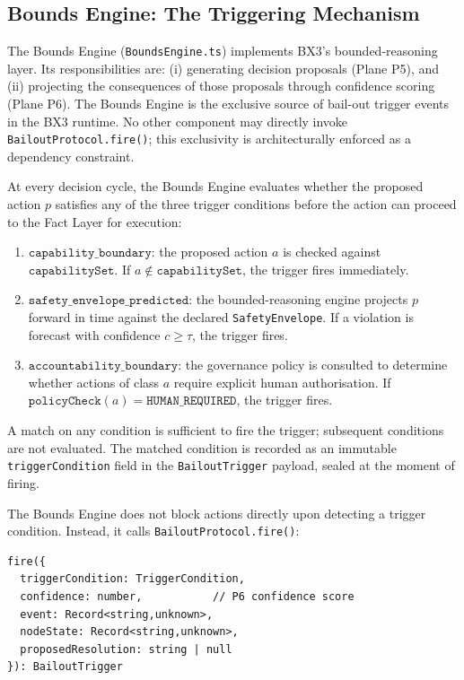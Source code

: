 \documentclass[12pt]{article}
\begin{document}
\subsection{Bounds Engine: The Triggering Mechanism}
\label{sec:bounds-engine-trigger}

The Bounds Engine (\texttt{BoundsEngine.ts}) implements BX3's bounded-reasoning layer. Its responsibilities are: (i) generating decision proposals (Plane P5), and (ii) projecting the consequences of those proposals through confidence scoring (Plane P6). The Bounds Engine is the exclusive source of bail-out trigger events in the BX3 runtime. No other component may directly invoke \texttt{BailoutProtocol.fire()}; this exclusivity is architecturally enforced as a dependency constraint.

At every decision cycle, the Bounds Engine evaluates whether the proposed action $p$ satisfies any of the three trigger conditions before the action can proceed to the Fact Layer for execution:

\begin{enumerate}
  \item[\textbf{C1}] $\texttt{capability\_boundary}$: the proposed action $a$ is checked against $\texttt{capabilitySet}$. If $a \notin \texttt{capabilitySet}$, the trigger fires immediately.
  \item[\textbf{C2}] $\texttt{safety\_envelope\_predicted}$: the bounded-reasoning engine projects $p$ forward in time against the declared \texttt{SafetyEnvelope}. If a violation is forecast with confidence $c \geq \tau$, the trigger fires.
  \item[\textbf{C3}] $\texttt{accountability\_boundary}$: the governance policy is consulted to determine whether actions of class $a$ require explicit human authorisation. If $\texttt{policyCheck}(a) = \texttt{HUMAN\_REQUIRED}$, the trigger fires.
\end{enumerate}

A match on any condition is sufficient to fire the trigger; subsequent conditions are not evaluated. The matched condition is recorded as an immutable \texttt{triggerCondition} field in the \texttt{BailoutTrigger} payload, sealed at the moment of firing.

The Bounds Engine does not block actions directly upon detecting a trigger condition. Instead, it calls \texttt{BailoutProtocol.fire()}:

\begin{verbatim}
fire({
  triggerCondition: TriggerCondition,
  confidence: number,           // P6 confidence score
  event: Record<string,unknown>,
  nodeState: Record<string,unknown>,
  proposedResolution: string | null
}): BailoutTrigger
\end{verbatim}
\end{document}

